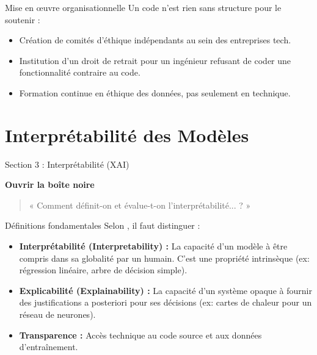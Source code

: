 \documentclass[9pt, aspectratio=169]{beamer}
\begin{document}
\begin{frame}{Mise en \oe uvre organisationnelle}
    Un code n'est rien sans structure pour le soutenir :
    \begin{itemize}
        \item Création de comités d'éthique indépendants au sein des entreprises tech.
        \item Institution d'un droit de retrait pour un ingénieur refusant de coder une fonctionnalité contraire au code.
        \item Formation continue en éthique des données, pas seulement en technique.
    \end{itemize}
\end{frame}

\section{Interprétabilité des Modèles}

\begin{frame}{Section 3 : Interprétabilité (XAI)}
    \begin{center}
        \Large \textbf{Ouvrir la boîte noire}
    \end{center}
    \vspace{1cm}
    \begin{quote}
        « Comment définit-on et évalue-t-on l'interprétabilité... ? »
    \end{quote}
\end{frame}

\begin{frame}{Définitions fondamentales}
    Selon \cite{Doran2017}, il faut distinguer :
    \begin{itemize}
        \item \textbf{Interprétabilité (Interpretability) :} La capacité d'un modèle à être compris dans sa globalité par un humain. C'est une propriété intrinsèque (ex: régression linéaire, arbre de décision simple).
        \item \textbf{Explicabilité (Explainability) :} La capacité d'un système opaque à fournir des justifications a posteriori pour ses décisions (ex: cartes de chaleur pour un réseau de neurones).
        \item \textbf{Transparence :} Accès technique au code source et aux données d'entraînement.
    \end{itemize}
\end{frame}
\end{document}
